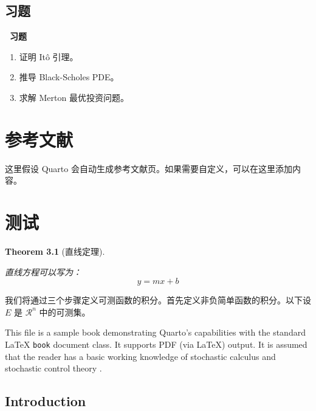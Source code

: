 \documentclass[
  11pt,
  letterpaper,
  oneside,
  a4paper]{book}
\makeatletter
\providecommand{\tightlist}{%
  \setlength{\itemsep}{0pt}\setlength{\parskip}{0pt}}
\newcounter{problem}[chapter]
\newenvironment{problemset}[1][习题]{
  \vspace*{10pt}
  \begin{center}
    \textcolor{structurecolor}{\Large\bfseries\adftripleflourishleft~#1~\adftripleflourishright}
  \end{center}}{
  \par}
\numberwithin{equation}{chapter}
\def\cleardoublepage{\clearpage\ifodd\c@page\else
    \hbox{}\thispagestyle{empty}\newpage\fi}
\let\oldchapter\chapter
\renewcommand{\chapter}{%
    \cleardoublepage
    \oldchapter
  }%
\theoremstyle{plain}
\theoremstyle{plain}
\theoremstyle{plain}
\theoremstyle{plain}
\newtheorem{theorem}{Theorem}[chapter]
\theoremstyle{definition}
\theoremstyle{remark}
\makeatother
\begin{document}
\section{习题}\label{ux4e60ux9898}

\begin{problemset}

\begin{enumerate}
\def\labelenumi{\arabic{enumi}.}
\tightlist
\item
  证明 Itô 引理。
\item
  推导 Black-Scholes PDE。
\item
  求解 Merton 最优投资问题。
\end{enumerate}

\end{problemset}


\chapter{参考文献}\label{ux53c2ux8003ux6587ux732e}

这里假设 Quarto
会自动生成参考文献页。如果需要自定义，可以在这里添加内容。


\chapter{测试}\label{ux6d4bux8bd5}

\begin{theorem}[直线定理]\protect\hypertarget{thm-line}{}\label{thm-line}

直线方程可以写为： \[ y = mx + b \]

\end{theorem}

我们将通过三个步骤定义可测函数的积分。首先定义非负简单函数的积分。以下设
\(E\) 是 \(\mathcal{R}^n\) 中的可测集。

This file is a sample book demonstrating Quarto's capabilities with the
standard LaTeX \texttt{book} document class. It supports PDF (via LaTeX)
output. It is assumed that the reader has a basic working knowledge of
stochastic calculus \citet{karatzas1991brownian} and stochastic control
theory \citet{yong1999sch}.

\section{Introduction}\label{introduction-2}
\end{document}
